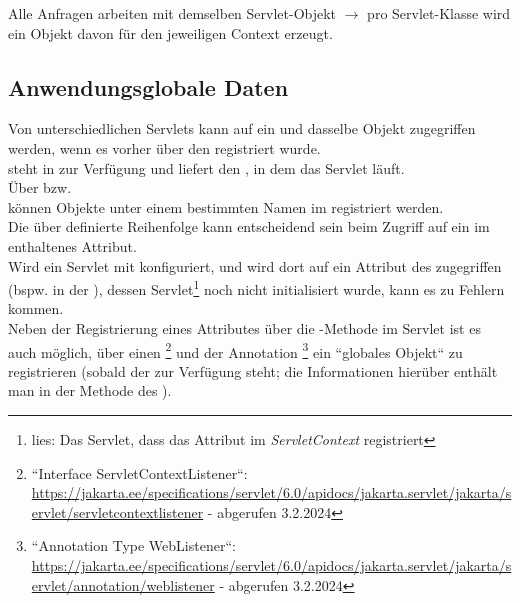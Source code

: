 \begin{tcolorbox}[enlarge top by=0.5cm,enlarge bottom by=0.5cm]
Alle Anfragen arbeiten mit demselben Servlet-Objekt $\rightarrow$ pro Servlet-Klasse wird ein Objekt davon für den jeweiligen Context erzeugt.
\end{tcolorbox}


\subsection{Anwendungsglobale Daten}

Von unterschiedlichen Servlets kann auf ein und dasselbe Objekt zugegriffen werden, wenn es vorher über den  registriert wurde.\\
 steht in  zur Verfügung und liefert den , in dem das Servlet läuft.\\
Über  bzw.\\  können Objekte unter einem bestimmten Namen im  registriert werden.\\

\noindent
Die über  definierte Reihenfolge kann entscheidend sein beim Zugriff auf ein im  enthaltenes Attribut.\\
Wird ein Servlet mit  konfiguriert, und wird dort auf ein Attribut des  zugegriffen (bspw. in der ), dessen Servlet\footnote{
lies: Das Servlet, dass das Attribut im \textit{ServletContext} registriert
} noch nicht initialisiert wurde, kann es zu Fehlern kommen.\\

\noindent
Neben der Registrierung eines Attributes über die -Methode im Servlet ist es auch möglich, über einen \footnote{
    ``Interface ServletContextListener``: \url{https://jakarta.ee/specifications/servlet/6.0/apidocs/jakarta.servlet/jakarta/servlet/servletcontextlistener} - abgerufen 3.2.2024
} und der Annotation \footnote{
``Annotation Type WebListener``: \url{https://jakarta.ee/specifications/servlet/6.0/apidocs/jakarta.servlet/jakarta/servlet/annotation/weblistener} - abgerufen 3.2.2024
} ein ``globales Objekt`` zu registrieren (sobald der  zur Verfügung steht; die Informationen hierüber enthält man in der Methode  des ).\\

